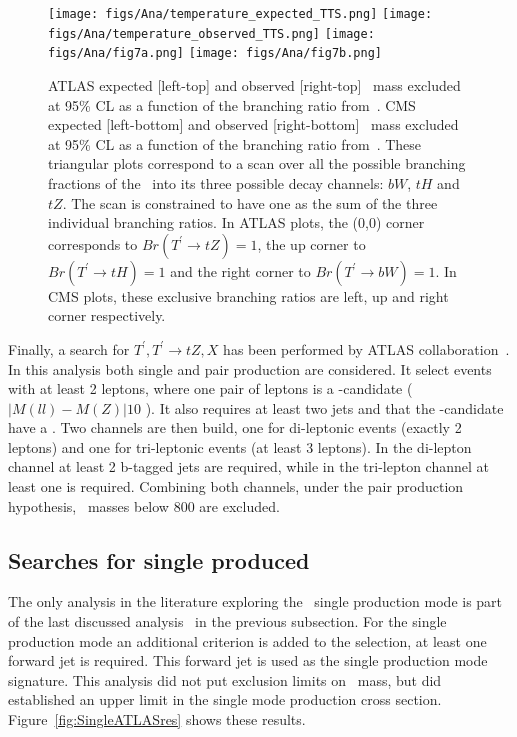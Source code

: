 \begin{figure}[!Hhtbp]
  \begin{center}
    \texttt{[image: figs/Ana/temperature\_expected\_TTS.png]}
    \texttt{[image: figs/Ana/temperature\_observed\_TTS.png]}
    \texttt{[image: figs/Ana/fig7a.png]}
    \texttt{[image: figs/Ana/fig7b.png]}
    \caption{ATLAS expected [left-top] and observed [right-top] \Tp~mass excluded at 95\% CL as a function of the branching ratio from~\cite{Aad:2015gdg}. CMS expected [left-bottom] and observed [right-bottom] \Tp~mass excluded at 95\% CL as a function of the branching ratio from~\cite{Chatrchyan:2013uxa}. These triangular plots correspond to a scan over all the possible branching fractions of the \Tp~into its three possible decay channels: $bW$, $tH$ and $tZ$. The scan is constrained to have one as the sum of the three individual branching ratios. In ATLAS plots, the (0,0) corner corresponds to $Br(T^{'}\rightarrow tZ)=1$, the up corner to $Br(T^{'}\rightarrow tH)=1$ and the right corner to $Br(T^{'}\rightarrow bW)=1$. In CMS plots, these exclusive branching ratios are left, up and right corner respectively.}
    \label{fig:ATLASCMSres}
  \end{center}
\end{figure}

Finally, a search for $T^{'},T^{'}\rightarrow tZ,X$ has been performed by ATLAS collaboration~\cite{Aad:2014efa}. In this analysis both single and pair production are considered. It select events with at least 2 leptons, where one pair of leptons is a \Z-candidate ($|M(ll)-M(Z)|10$ \GeVcc). It also requires at least two jets and that the \Z-candidate have a . Two channels are then build, one for di-leptonic events (exactly 2 leptons) and one for tri-leptonic events (at least 3 leptons). In the di-lepton channel at least 2 b-tagged jets are required, while in the tri-lepton channel at least one is required. Combining both channels, under the pair production hypothesis, \Tp~masses below 800 \GeVcc are excluded.

\subsection{Searches for single produced \Tp}
\label{sec:singleanal}

The only analysis in the literature exploring the \Tp~single production mode is part of the last discussed analysis~\cite{Aad:2014efa} in the previous subsection. For the single production mode an additional criterion is added to the selection, at least one forward jet is required. This forward jet is used as the single production mode signature. This analysis did not put exclusion limits on \Tp~mass, but did established an upper limit in the single mode production cross section. Figure~\ref{fig:SingleATLASres} shows these results.

